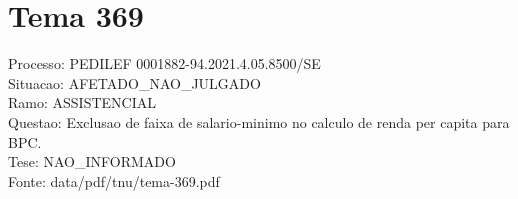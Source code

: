 \documentclass[12pt]{article}
\begin{document}
\section*{Tema 369}
Processo: PEDILEF 0001882-94.2021.4.05.8500/SE\\
Situacao: AFETADO\_NAO\_JULGADO\\
Ramo: ASSISTENCIAL\\
Questao: Exclusao de faixa de salario-minimo no calculo de renda per capita para BPC.\\
Tese: NAO\_INFORMADO\\
Fonte: data/pdf/tnu/tema-369.pdf
\end{document}
